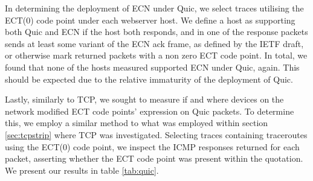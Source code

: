 \documentclass{l4proj}
\begin{document}
In determining the deployment of ECN under Quic, we select traces utilising the ECT(0) code point under each webserver host. We define a host as supporting both Quic and ECN if the host both responds, and in one of the response packets sends at least some variant of the ECN ack frame, as defined by the IETF draft\cite{thomson_quic_2020}, or otherwise mark returned packets with a non zero ECT code point. In total, we found that none of the hosts measured supported ECN under Quic, again. This should be expected due to the relative immaturity of the deployment of Quic.

Lastly, similarly to TCP, we sought to measure if and where devices on the network modified ECT code points' expression on Quic packets. To determine this, we employ a similar method to what was employed within section \ref{sec:tcpstrip} where TCP was investigated. Selecting traces containing traceroutes using the ECT(0) code point, we inspect the ICMP responses returned for each packet, asserting whether the ECT code point was present within the quotation. We present our results in table \ref{tab:quic}.
\end{document}
